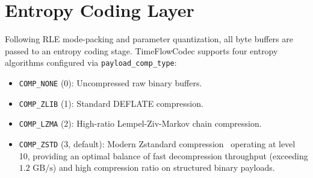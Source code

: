 \section{Entropy Coding Layer}
Following RLE mode-packing and parameter quantization, all byte buffers are passed to an entropy coding stage. TimeFlowCodec supports four entropy algorithms configured via \texttt{payload\_comp\_type}:
\begin{itemize}
    \item \texttt{COMP\_NONE} (0): Uncompressed raw binary buffers.
    \item \texttt{COMP\_ZLIB} (1): Standard DEFLATE compression.
    \item \texttt{COMP\_LZMA} (2): High-ratio Lempel-Ziv-Markov chain compression.
    \item \texttt{COMP\_ZSTD} (3, default): Modern Zstandard compression~\cite{collet2015zstandard} operating at level 10, providing an optimal balance of fast decompression throughput (exceeding $1.2\text{ GB/s}$) and high compression ratio on structured binary payloads.
\end{itemize}
